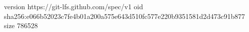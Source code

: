 version https://git-lfs.github.com/spec/v1
oid sha256:e066b52023c7fe4b01a200a575e643d510fc577e220b9351581d2d473c91b877
size 786528
